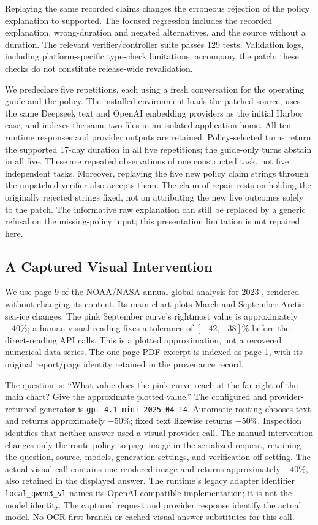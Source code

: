 Replaying the same recorded claims changes the erroneous rejection of the policy explanation to supported. The focused regression includes the recorded explanation, wrong-duration and negated alternatives, and the source without a duration. The relevant verifier/controller suite passes 129 tests. Validation logs, including platform-specific type-check limitations, accompany the patch; these checks do not constitute release-wide revalidation.

We predeclare five repetitions, each using a fresh conversation for the operating guide and the policy. The installed environment loads the patched source, uses the same Deepseek text and OpenAI embedding providers as the initial Harbor case, and indexes the same two files in an isolated application home. All ten runtime responses and provider outputs are retained. Policy-selected turns return the supported 17-day duration in all five repetitions; the guide-only turns abstain in all five. These are repeated observations of one constructed task, not five independent tasks. Moreover, replaying the five new policy claim strings through the unpatched verifier also accepts them. The claim of repair rests on holding the originally rejected strings fixed, not on attributing the new live outcomes solely to the patch. The informative raw explanation can still be replaced by a generic refusal on the missing-policy input; this presentation limitation is not repaired here.

\subsection{A Captured Visual Intervention}
We use page 9 of the NOAA/NASA annual global analysis for 2023 \citep{noaanasa2024analysis}, rendered without changing its content. Its main chart plots March and September Arctic sea-ice changes. The pink September curve's rightmost value is approximately $-40\%$; a human visual reading fixes a tolerance of $[-42,-38]\%$ before the direct-reading API calls. This is a plotted approximation, not a recovered numerical data series. The one-page PDF excerpt is indexed as page 1, with its original report/page identity retained in the provenance record.

The question is: ``What value does the pink curve reach at the far right of the main chart? Give the approximate plotted value.'' The configured and provider-returned generator is \texttt{gpt-4.1-mini-2025-04-14}. Automatic routing chooses text and returns approximately $-50\%$; fixed text likewise returns $-50\%$. Inspection identifies that neither answer used a visual-provider call. The manual intervention changes only the route policy to page-image in the serialized request, retaining the question, source, models, generation settings, and verification-off setting. The actual visual call contains one rendered image and returns approximately $-40\%$, also retained in the displayed answer. The runtime's legacy adapter identifier \texttt{local\_qwen3\_vl} names its OpenAI-compatible implementation; it is not the model identity. The captured request and provider response identify the actual model. No OCR-first branch or cached visual answer substitutes for this call.

